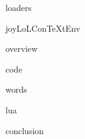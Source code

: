 
\usemodule[t-diSimp]

\startDiSimpComponent loaders

\diSimpEnvironment joyLoLConTeXtEnv

\startJoyLoLCoAlg[title=Loaders][loaders]

\diSimpComponent overview

\diSimpComponent code

\diSimpComponent words

\diSimpComponent lua

\diSimpComponent conclusion

\stopJoyLoLCoAlg

\stopDiSimpComponent
